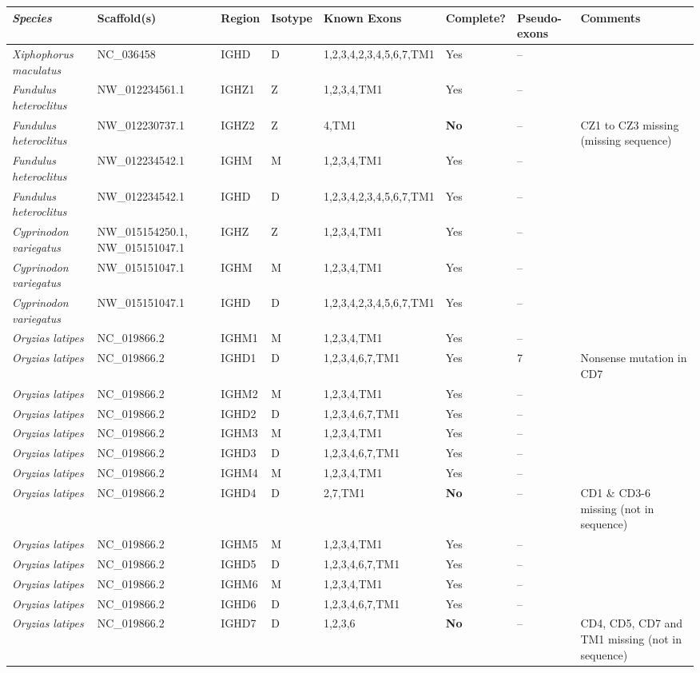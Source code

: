 \begin{tabular}{>{\itshape}lllllllp{4cm}}
  \toprule \textnormal{\textbf{Species}} & \textbf{Scaffold(s)} & \textbf{Region} & \textbf{Isotype} & \textbf{Known Exons} \tnote{1} & \textbf{Complete?} & \textbf{Pseudo-exons} & \textbf{Comments} \\ 
  \midrule Xiphophorus maculatus & NC\_036458 & IGHD & D & 1,2,3,4,2,3,4,5,6,7,TM1 & Yes & -- &  \\ 
  Fundulus heteroclitus & NW\_012234561.1 & IGHZ1 & Z & 1,2,3,4,TM1 & Yes & -- &  \\ 
  Fundulus heteroclitus & NW\_012230737.1 & IGHZ2 & Z & 4,TM1 & \textbf{No} & -- & CZ1 to CZ3 missing (missing sequence) \\ 
  Fundulus heteroclitus & NW\_012234542.1 & IGHM & M & 1,2,3,4,TM1 & Yes & -- &  \\ 
  Fundulus heteroclitus & NW\_012234542.1 & IGHD & D & 1,2,3,4,2,3,4,5,6,7,TM1 & Yes & -- &  \\ 
  Cyprinodon variegatus & NW\_015154250.1, NW\_015151047.1 & IGHZ & Z & 1,2,3,4,TM1 & Yes & -- &  \\ 
  Cyprinodon variegatus & NW\_015151047.1 & IGHM & M & 1,2,3,4,TM1 & Yes & -- &  \\ 
  Cyprinodon variegatus & NW\_015151047.1 & IGHD & D & 1,2,3,4,2,3,4,5,6,7,TM1 & Yes & -- &  \\ 
  Oryzias latipes & NC\_019866.2 & IGHM1 & M & 1,2,3,4,TM1 & Yes & -- &  \\ 
  Oryzias latipes & NC\_019866.2 & IGHD1 & D & 1,2,3,4,6,7,TM1 & Yes & 7 & Nonsense mutation in CD7 \\ 
  Oryzias latipes & NC\_019866.2 & IGHM2 & M & 1,2,3,4,TM1 & Yes & -- &  \\ 
  Oryzias latipes & NC\_019866.2 & IGHD2 & D & 1,2,3,4,6,7,TM1 & Yes & -- &  \\ 
  Oryzias latipes & NC\_019866.2 & IGHM3 & M & 1,2,3,4,TM1 & Yes & -- &  \\ 
  Oryzias latipes & NC\_019866.2 & IGHD3 & D & 1,2,3,4,6,7,TM1 & Yes & -- &  \\ 
  Oryzias latipes & NC\_019866.2 & IGHM4 & M & 1,2,3,4,TM1 & Yes & -- &  \\ 
  Oryzias latipes & NC\_019866.2 & IGHD4 & D & 2,7,TM1 & \textbf{No} & -- & CD1 \& CD3-6 missing (not in sequence) \\ 
  Oryzias latipes & NC\_019866.2 & IGHM5 & M & 1,2,3,4,TM1 & Yes & -- &  \\ 
  Oryzias latipes & NC\_019866.2 & IGHD5 & D & 1,2,3,4,6,7,TM1 & Yes & -- &  \\ 
  Oryzias latipes & NC\_019866.2 & IGHM6 & M & 1,2,3,4,TM1 & Yes & -- &  \\ 
  Oryzias latipes & NC\_019866.2 & IGHD6 & D & 1,2,3,4,6,7,TM1 & Yes & -- &  \\ 
  Oryzias latipes & NC\_019866.2 & IGHD7 & D & 1,2,3,6 & \textbf{No} & -- & CD4, CD5, CD7 and TM1 missing (not in sequence) \\ 
   \bottomrule \end{tabular}
